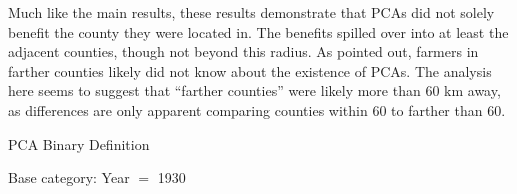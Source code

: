 \documentclass[12pt]{article}
\begin{document}
\begin{appendices}
Much like the main results, these results demonstrate that PCAs did not solely benefit the county they were located in. 
The benefits spilled over into at least the adjacent counties, though not beyond this radius.
As \citet{Arnold1958} pointed out, farmers in farther counties likely did not know about the existence of PCAs.
The analysis here seems to suggest that ``farther counties'' were likely more than 60 km away, as differences are only apparent comparing counties within 60 to farther than 60.


\def\sym#1{\ifmmode^{#1}\else\(^{#1}\)\fi}

\begin{table}[!htbp] \centering 
    \caption{PCA Binary Definition} 
    \label{pca_binary} 

    Base category: Year $=$ 1930

    \begin{threeparttable}[t]
\footnotesize   


\end{threeparttable}
\end{table}
\end{appendices}
\end{document}
